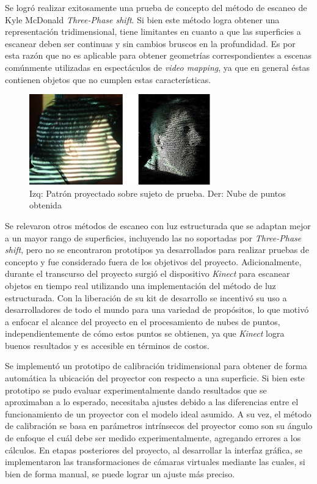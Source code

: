 Se logró realizar exitosamente una prueba de concepto del método de escaneo de Kyle McDonald \emph{Three-Phase shift}.
Si bien este método logra obtener una representación tridimensional, tiene limitantes en cuanto a que las superficies a escanear deben ser continuas y sin cambios bruscos en la profundidad. Es por esta razón que no es aplicable para obtener geometrías correspondientes a escenas comúnmente utilizadas en espectáculos de \emph{video mapping}, ya que en general éstas contienen objetos que no cumplen estas características.

\begin{figure}[H]
  \centering
    \includegraphics[width=0.7\textwidth]{./Cap7_conclusiones/Phase2.JPG}
  \caption[Imagen propia]{Izq: Patrón proyectado sobre sujeto de prueba. Der: Nube de puntos obtenida}
  \label{fig:cabeza}
\end{figure}

Se relevaron otros métodos de escaneo con luz estructurada que se adaptan mejor a un mayor rango de superficies, incluyendo las no soportadas por \emph{Three-Phase shift}, pero no se encontraron prototipos ya desarrollados para realizar pruebas de concepto y fue considerado fuera de los objetivos del proyecto.
Adicionalmente, durante el transcurso del proyecto surgió el dispositivo \emph{Kinect} para escanear objetos en tiempo real utilizando una implementación del método de luz estructurada. Con la liberación de su kit de desarrollo se incentivó su uso a desarrolladores de todo el mundo para una variedad de propósitos, lo que motivó a enfocar el alcance del proyecto en el procesamiento de nubes de puntos, independientemente de cómo estos puntos se obtienen, ya que \emph{Kinect} logra buenos resultados y es accesible en términos de costos.

Se implementó un prototipo de calibración tridimensional para obtener de forma automática la ubicación del proyector con respecto a una superficie.
Si bien este prototipo se pudo evaluar experimentalmente dando resultados que se aproximaban a lo esperado, necesitaba ajustes debido a las diferencias entre el funcionamiento de un proyector con el modelo ideal asumido. A su vez, el método de calibración se basa en parámetros intrínsecos del proyector como son su ángulo de enfoque el cuál debe ser medido experimentalmente, agregando errores a los cálculos.
En etapas posteriores del proyecto, al desarrollar la interfaz gráfica, se implementaron las transformaciones de cámaras virtuales mediante las cuales, si bien de forma manual, se puede lograr un ajuste más preciso.

